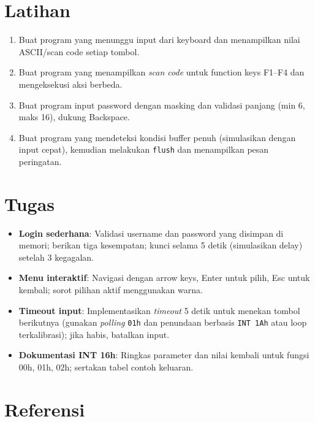 \section{Latihan}
\begin{enumerate}
  \item Buat program yang menunggu input dari keyboard dan menampilkan nilai ASCII/scan code setiap tombol.
  \item Buat program yang menampilkan \textit{scan code} untuk function keys F1--F4 dan mengeksekusi aksi berbeda.
  \item Buat program input password dengan masking dan validasi panjang (min 6, maks 16), dukung Backspace.
  \item Buat program yang mendeteksi kondisi buffer penuh (simulasikan dengan input cepat), kemudian melakukan \texttt{flush} dan menampilkan pesan peringatan.
\end{enumerate}

\section{Tugas}
\begin{itemize}
  \item \textbf{Login sederhana}: Validasi username dan password yang disimpan di memori; berikan tiga kesempatan; kunci selama 5 detik (simulasikan delay) setelah 3 kegagalan.
  \item \textbf{Menu interaktif}: Navigasi dengan arrow keys, Enter untuk pilih, Esc untuk kembali; sorot pilihan aktif menggunakan warna.
  \item \textbf{Timeout input}: Implementasikan \textit{timeout} 5 detik untuk menekan tombol berikutnya (gunakan \textit{polling} \texttt{01h} dan penundaan berbasis \texttt{INT 1Ah} atau loop terkalibrasi); jika habis, batalkan input.
  \item \textbf{Dokumentasi INT 16h}: Ringkas parameter dan nilai kembali untuk fungsi 00h, 01h, 02h; sertakan tabel contoh keluaran.
\end{itemize}

\section{Referensi}
